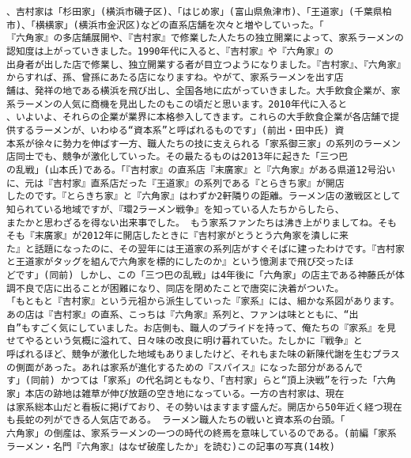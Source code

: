 \documentclass[11pt]{article}
\begin{document}
\begin{Verbatim}[commandchars=\\\{\}]
、吉村家は「杉田家」(横浜市磯子区)、「はじめ家」(富山県魚津市)、「王道家」(千葉県柏市)、「横横家」(横浜市金沢区)などの直系店舗を次々と増やしていった。「
『六角家』の多店舗展開や、『吉村家』で修業した人たちの独立開業によって、家系ラーメンの認知度は上がっていきました。1990年代に入ると、『吉村家』や『六角家』の
出身者が出した店で修業し、独立開業する者が目立つようになりました。『吉村家』、『六角家』からすれば、孫、曾孫にあたる店になりますね。やがて、家系ラーメンを出す店
舗は、発祥の地である横浜を飛び出し、全国各地に広がっていきました。大手飲食企業が、家系ラーメンの人気に商機を見出したのもこの頃だと思います。2010年代に入ると
、いよいよ、それらの企業が業界に本格参入してきます。これらの大手飲食企業が各店舗で提供するラーメンが、いわゆる“資本系”と呼ばれるものです」(前出・田中氏) 資
本系が徐々に勢力を伸ばす一方、職人たちの技に支えられる「家系御三家」の系列のラーメン店同士でも、競争が激化していった。その最たるものは2013年に起きた「三つ巴
の乱戦」(山本氏)である。「『吉村家』の直系店『末廣家』と『六角家』がある県道12号沿いに、元は『吉村家』直系店だった『王道家』の系列である『とらきち家』が開店
したのです。『とらきち家』と『六角家』はわずか2軒隣りの距離。ラーメン店の激戦区として知られている地域ですが、『環2ラーメン戦争』を知っている人たちからしたら、
またかと思わざるを得ない出来事でした。 もう家系ファンたちは沸き上がりましてね。そもそも『末廣家』が2012年に開店したときに『吉村家がとうとう六角家を潰しに来
た』と話題になったのに、その翌年には王道家の系列店がすぐそばに建ったわけです。『吉村家と王道家がタッグを組んで六角家を標的にしたのか』という憶測まで飛び交ったほ
どです」(同前) しかし、この「三つ巴の乱戦」は4年後に「六角家」の店主である神藤氏が体調不良で店に出ることが困難になり、同店を閉めたことで唐突に決着がついた。
「もともと『吉村家』という元祖から派生していった『家系』には、細かな系図があります。あの店は『吉村家』の直系、こっちは『六角家』系列と、ファンは味とともに、“出
自”もすごく気にしていました。お店側も、職人のプライドを持って、俺たちの『家系』を見せてやるという気概に溢れて、日々味の改良に明け暮れていた。たしかに『戦争』と
呼ばれるほど、競争が激化した地域もありましたけど、それもまた味の新陳代謝を生むプラスの側面があった。あれは家系が進化するための『スパイス』になった部分があるんで
す」(同前) かつては「家系」の代名詞ともなり、「吉村家」らと“頂上決戦”を行った「六角家」本店の跡地は雑草が伸び放題の空き地になっている。一方の吉村家は、現在
は家系総本山だと看板に掲げており、その勢いはますます盛んだ。開店から50年近く経つ現在も長蛇の列ができる人気店である。 ラーメン職人たちの戦いと資本系の台頭。「
六角家」の倒産は、家系ラーメンの一つの時代の終焉を意味しているのである。(前編「家系ラーメン・名門『六角家』はなぜ破産したか」を読む)この記事の写真(14枚)
    \end{Verbatim}
\end{document}
